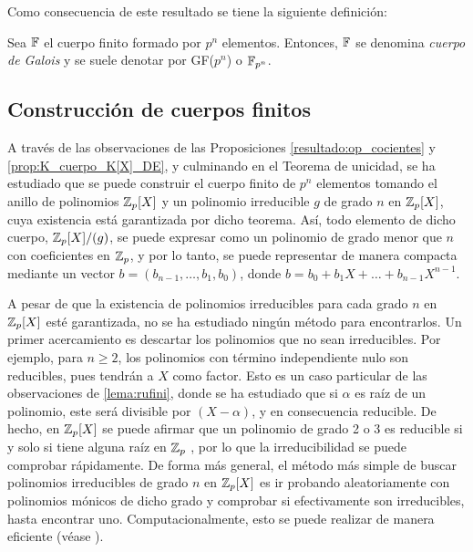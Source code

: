 \begin{Revision}
    Como consecuencia de este resultado se tiene la siguiente definición:
    \begin{deff}{\cite[p.~278]{Hungerford}}
        Sea $\mathbb{F}$ el cuerpo finito formado por $p^n$ elementos. Entonces, $\mathbb{F}$ se denomina \textit{cuerpo de Galois} y se suele denotar por GF($p^n$) o $\mathbb{F}_{p^n}$.
    \end{deff}
    
    \subsection*{Construcción de cuerpos finitos}
    
    A través de las observaciones de las Proposiciones \ref{resultado:op_cocientes} y \ref{prop:K_cuerpo_K[X]_DE}, y culminando en el Teorema de unicidad, se ha estudiado que se puede construir el cuerpo finito de $p^n$ elementos tomando el anillo de polinomios $\mathbb{Z}_p[X]$ y un polinomio irreducible $g$ de grado $n$ en $\mathbb{Z}_p[X]$, cuya existencia está garantizada por dicho teorema. Así, todo elemento de dicho cuerpo, $\mathbb{Z}_p[X]/(g)$, se puede expresar como un polinomio de grado menor que $n$ con coeficientes en $\mathbb{Z}_p$, y por lo tanto, se puede representar de manera compacta mediante un vector $b = (b_{n-1}, \ldots , b_1, b_0)$, donde $b = b_0 + b_1X + \ldots + b_{n-1}X^{n-1}$.

    A pesar de que la existencia de polinomios irreducibles para cada grado $n$ en $\mathbb{Z}_p[X]$ esté garantizada, no se ha estudiado ningún método para encontrarlos. Un primer acercamiento es descartar los polinomios que no sean irreducibles. Por ejemplo, para $n\geq2$, los polinomios con término independiente nulo son reducibles, pues tendrán a $X$ como factor. Esto es un caso particular de las observaciones de \ref{lema:rufini}, donde se ha estudiado que si $\alpha$ es raíz de un polinomio, este será divisible por $(X-\alpha)$, y en consecuencia reducible. De hecho, en $\mathbb{Z}_p[X]$ se puede afirmar que un polinomio de grado 2 o 3 es reducible si y solo si tiene alguna raíz en $\mathbb{Z}_p$ \cite[p.~142]{GamboaAnillos}, por lo que la irreducibilidad se puede comprobar rápidamente. De forma más general, el método más simple de buscar polinomios irreducibles de grado $n$ en $\mathbb{Z}_p[X]$ es ir probando aleatoriamente con polinomios mónicos de dicho grado y comprobar si efectivamente son irreducibles, hasta encontrar uno. Computacionalmente, esto se puede realizar de manera eficiente (véase \cite{Shoup2005}).



\end{Revision}
